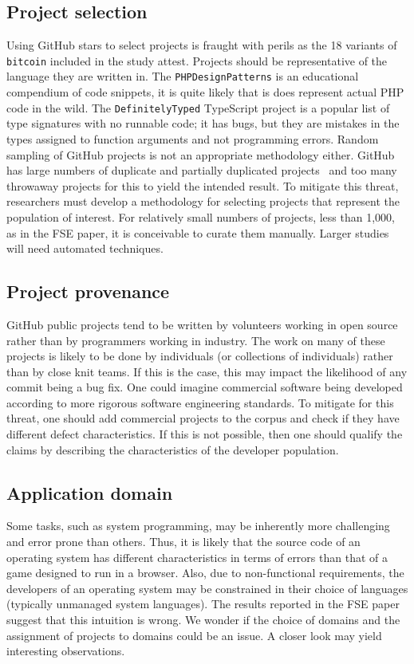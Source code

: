 \documentclass[acmsmall]{acmart}
\newcommand{\ts}{{\sf  TypeScript}\xspace}
\newcommand{\php}{{\sf  PHP}\xspace}
\newcommand{\gh}{{GitHub}\xspace}
\newcommand{\code}[1]{{\tt\small #1}\xspace}
\begin{document}
\subsection{Project selection} 

Using \gh stars to select projects is fraught with perils as the 18 variants
of \code{bitcoin} included in the study attest.  Projects should be
representative of the language they are written in.  The
\code{PHP\-Design\-Patterns} is an educational compendium of code snippets,
it is quite likely that is does represent actual \php code in the wild.  The
\code{Definitely\-Typed} \ts project is a popular list of type signatures
with no runnable code; it has bugs, but they are mistakes in the types
assigned to function arguments and not programming errors.  Random sampling
of \gh projects is not an appropriate methodology either. \gh has large
numbers of duplicate and partially duplicated projects~\cite{oopsla17a} and
too many throwaway projects for this to yield the intended result.  To
mitigate this threat, researchers must develop a methodology for selecting
projects that represent the population of interest. For relatively small
numbers of projects, less than 1,000, as in the FSE paper, it is conceivable
to curate them manually. Larger studies will need automated techniques.

\subsection{Project provenance} 

\gh public projects tend to be written by volunteers working in open source
rather than by programmers working in industry. The work on many of these
projects is likely to be done by individuals (or collections of individuals)
rather than by close knit teams. If this is the case, this may impact the
likelihood of any commit being a bug fix. One could imagine commercial
software being developed according to more rigorous software engineering
standards.  To mitigate for this threat, one should add commercial projects
to the corpus and check if they have different defect characteristics.
If this is not possible, then one should qualify the claims by describing
the characteristics of the developer population.

\subsection{Application domain} 

Some tasks, such as system programming, may be inherently more challenging and
error prone than others. Thus, it is likely that the source code of an
operating system has different characteristics in terms of errors than
that of a game designed to run in a browser. Also, due to non-functional
requirements, the developers of an operating system may be constrained in
their choice of languages (typically unmanaged system languages).  The
results reported in the FSE paper suggest that this intuition is wrong.  We
wonder if the choice of domains and the assignment of projects to domains
could be an issue. A closer look may yield interesting observations.
\end{document}
